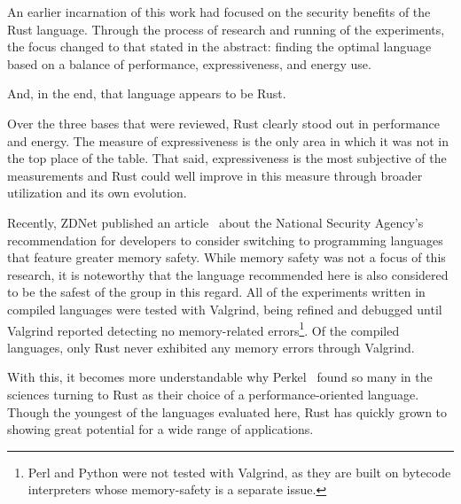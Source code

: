 An earlier incarnation of this work had focused on the security benefits of the Rust language. Through the process of research and running of the experiments, the focus changed to that stated in the abstract: finding the optimal language based on a balance of performance, expressiveness, and energy use.

And, in the end, that language appears to be Rust.

Over the three bases that were reviewed, Rust clearly stood out in performance and energy. The measure of expressiveness is the only area in which it was not in the top place of the table. That said, expressiveness is the most subjective of the measurements and Rust could well improve in this measure through broader utilization and its own evolution.

Recently, ZDNet published an article~\cite{tung} about the National Security Agency's recommendation for developers to consider switching to programming languages that feature greater memory safety. While memory safety was not a focus of this research, it is noteworthy that the language recommended here is also considered to be the safest of the group in this regard. All of the experiments written in compiled languages were tested with Valgrind, being refined and debugged until Valgrind reported detecting no memory-related errors\footnote{Perl and Python were not tested with Valgrind, as they are built on bytecode interpreters whose memory-safety is a separate issue.}. Of the compiled languages, only Rust never exhibited any memory errors through Valgrind.

With this, it becomes more understandable why Perkel~\cite{nature} found so many in the sciences turning to Rust as their choice of a performance-oriented language. Though the youngest of the languages evaluated here, Rust has quickly grown to showing great potential for a wide range of applications.
